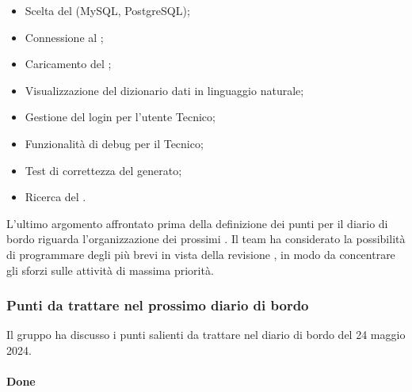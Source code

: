 \begin{itemize}
	\item Scelta del  (MySQL, PostgreSQL);
	\item Connessione al ;
	\item Caricamento del ;
	\item Visualizzazione del dizionario dati in linguaggio naturale;
	\item Gestione del login per l'utente Tecnico; 
	\item Funzionalità di debug per il Tecnico;
	\item Test di correttezza del  generato;
	\item Ricerca del .
\end{itemize}
\par L'ultimo argomento affrontato prima della definizione dei punti per il diario di bordo riguarda l'organizzazione dei prossimi . Il team ha considerato la possibilità di programmare degli  più brevi in vista della revisione , in modo da concentrare gli sforzi sulle attività di massima priorità.

\subsubsection{Punti da trattare nel prossimo diario di bordo}
\par Il gruppo ha discusso i punti salienti da trattare nel diario di bordo del 24 maggio 2024.
\paragraph{Done}
